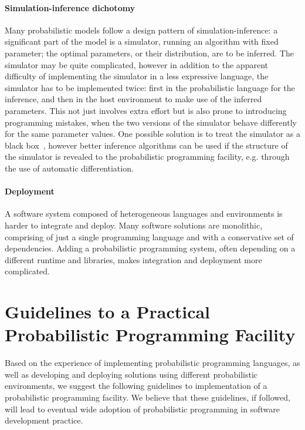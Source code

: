 \documentclass[sigplan,review]{acmart}\settopmatter{printfolios=true,printccs=false,printacmref=false}
\begin{document}
\paragraph{Simulation-inference dichotomy} Many probabilistic
models follow a design pattern of simulation-inference: a
significant part of the model is a simulator, running an
algorithm with fixed parameter; the optimal parameters, or their
distribution, are to be inferred. The simulator may be quite
complicated, however in addition to the apparent difficulty of
implementing the simulator in a less expressive language,  the
simulator has to be implemented twice: first in the
probabilistic language for the inference, and then in the host
environment to make use of the inferred parameters. This not
just involves extra effort but is also prone to introducing
programming mistakes, when the two versions of the simulator
behave differently for the same parameter values. One possible
solution is to treat the simulator as a black box~\cite{LBW17},
however better inference algorithms can be used if the structure
of the simulator is revealed to the probabilistic programming
facility, e.g. through the use of automatic differentiation.

\paragraph{Deployment} A software system composed of
heterogeneous languages and environments is harder to integrate
and deploy. Many software solutions are monolithic, comprising
of just a single programming language and with a conservative
set of dependencies. Adding a probabilistic programming system,
often depending on a different runtime and libraries, makes
integration and deployment more complicated.

\section{Guidelines to a Practical Probabilistic Programming
Facility}

Based on the experience of implementing  probabilistic
programming languages, as well as developing and deploying solutions
using different probabilistic environments, we suggest
the following guidelines to implementation of a probabilistic
programming facility. We believe that these guidelines, if
followed, will lead to eventual wide adoption of probabilistic
programming in software development practice.
\end{document}
